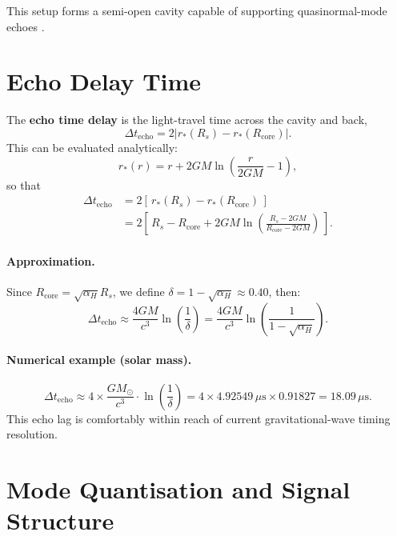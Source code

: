 \documentclass[a4paper, 12pt, oneside]{book}
\numberwithin{equation}{chapter}
\begin{document}
This setup forms a semi-open cavity capable of supporting quasinormal-mode echoes 	\cite{Abedi2017}.

\section{Echo Delay Time}
\label{sec:EchoDelay}

The \textbf{echo time delay} is the light-travel time across the cavity and back,
\[
    \Delta t_{\text{echo}} = 2\left|r_*(R_s) - r_*(R_{\text{core}})\right|.
\]
This can be evaluated analytically:
\[
    r_*(r) = r + 2GM \ln\left( \frac{r}{2GM} - 1 \right),
\]
so that
\begin{align*}
    \Delta t_{\text{echo}}
    &= 2\left[\,r_*(R_s) - r_*(R_{\text{core}})\,\right] \\
    &= 2\left[\,R_s - R_{\text{core}} +
               2GM\ln\left(\frac{R_s - 2GM}{R_{\text{core}} - 2GM}\right)
        \,\right].
\end{align*}

\paragraph{Approximation.}
Since \( R_{\text{core}} = \sqrt{\alpha_H} R_s \), we define \( \delta = 1 - \sqrt{\alpha_H} \approx 0.40 \), then:
\[
    \Delta t_{\text{echo}} \approx \frac{4GM}{c^{3}} \ln\left(\frac{1}{\delta}\right) 
    = \frac{4GM}{c^{3}} \ln\left(\frac{1}{1 - \sqrt{\alpha_H}}\right).
\]

\paragraph{Numerical example (solar mass).}
\[
    \Delta t_{\text{echo}} \approx 4 \times \frac{GM_\odot}{c^{3}} \cdot \ln(\frac{1}{\delta}) = 4 \times 4.92549\,\mu\text{s} \times 0.91827 = 18.09\,\mu\text{s}.
\]
This echo lag is comfortably within reach of current gravitational-wave timing resolution.

\section{Mode Quantisation and Signal Structure}
\label{sec:ModeQuantisation}
\end{document}
